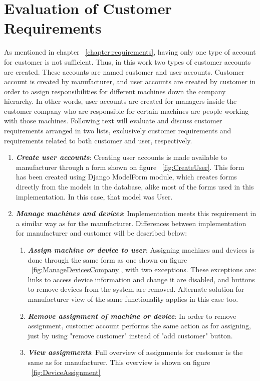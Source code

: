 \section{Evaluation of Customer Requirements}

As mentioned in chapter ~\ref{chapter:requirements}, having only one type of account for customer is not sufficient. Thus, in this work two types of customer accounts are created. These accounts are named customer and user accounts. Customer account is created by manufacturer, and user accounts are created by customer in order to assign responsibilities for different machines down the company hierarchy. In other words, user accounts are created for managers inside the customer company who are responsible for certain machines are people working with those machines. Following text will evaluate and discuss customer requirements arranged in two lists, exclusively customer requirements and requirements related to both customer and user, respectively.

\begin{enumerate}
	\setlength{\itemsep}{1pt}
	\item \textbf{\textit{Create user accounts}}: Creating user accounts is made available to manufacturer through a form shown on figure ~\ref{fig:CreateUser}. This form has been created using Django ModelForm module, which creates forms directly from the models in the database, alike most of the forms used in this implementation. In this case, that model was User.

	\item \textbf{\textit{Manage machines and devices}}: Implementation meets this requirement in a similar way as for the manufacturer. Differences between implementation for manufacturer and customer will be described below:

		\begin{enumerate}
			\item \textbf{\textit{Assign machine or device to user}}: Assigning machines and devices is done through the same form as one shown on figure ~\ref{fig:ManageDevicesCompany}, with two exceptions. These exceptions are: links to access device information and change it are disabled, and buttons to remove devices from the system are removed. Alternate solution for manufacturer view of the same functionality applies in this case too.

			\item \textbf{\textit{Remove assignment of machine or device}}: In order to remove assignment, customer account performs the same action as for assigning, just by using "remove customer" instead of "add customer" button.

			\item \textbf{\textit{View assignments}}: Full overview of assignments for customer is the same as for manufacturer. This overview is shown on figure ~\ref{fig:DeviceAssignment}
		\end{enumerate}
\end{enumerate}


